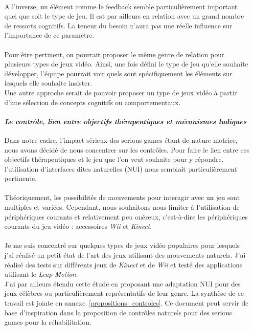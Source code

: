 \paragraph{}A l'inverse, un élément comme le feedback semble particulièrement important quel que soit le type de jeu. Il est par ailleurs en relation avec un grand nombre de ressorts cognitifs. La teneur du besoin n'aura pas une réelle influence sur l'importance de ce paramètre.

\paragraph{}Pour être pertinent, on pourrait proposer le même genre de relation pour plusieurs types de jeux vidéo. Ainsi, une fois défini le type de jeu qu'elle souhaite développer, l'équipe pourrait voir quels sont spécifiquement les éléments sur lesquels elle souhaite insister. \\
Une autre approche serait de pouvoir proposer un type de jeux vidéo à partir d'une sélection de concepts cognitifs ou comportementaux.

			\paragraph{\emph{Le contrôle, lien entre objectifs thérapeutiques et mécanismes ludiques}\\}
Dans notre cadre, l'impact sérieux des serious games étant de nature motrice, nous avons décidé de nous concentrer sur les contrôles. Pour faire le lien entre ces objectifs thérapeutiques et le jeu que l’on veut souhaite pour y répondre, l’utilisation d’interfaces dites naturelles (NUI) nous semblait particulièrement pertinente. 

\paragraph{} 
Théoriquement, les possibilités de mouvements pour interagir avec un jeu sont multiples et variées. Cependant, nous souhaitons nous limiter à l'utilisation de périphériques courants et relativement peu onéreux, c'est-à-dire les périphériques courants du jeu vidéo : accessoires \emph{Wii} et \emph{Kinect}.

\paragraph{} Je me suis concentré sur quelques types de jeux vidéo populaires pour lesquels j'ai réalisé un petit état de l'art des jeux utilisant des mouvements naturels. J'ai réalisé des tests sur différents jeux de \emph{Kinect} et de \emph{Wii} et testé des applications utilisant le \emph{Leap Motion}. \\J'ai par ailleurs étendu cette étude en proposant une adaptation NUI pour des jeux célèbres ou particulièrement représentatifs de leur genre.
La synthèse de ce travail est jointe en annexe~\ref{propositions_controles}. Ce document peut servir de base d'inspiration dans la proposition de contrôles naturels pour des serious games pour la réhabilitation.

